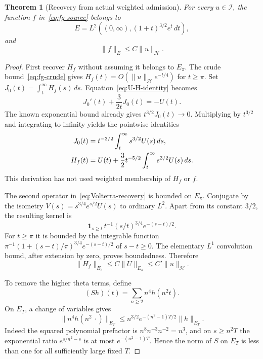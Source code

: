 \documentclass[11pt,a4paper]{article}
\numberwithin{equation}{section}
\newtheorem{theorem}{Theorem}[section]
\theoremstyle{definition}
\theoremstyle{remark}
\newcommand{\Hh}{\mathcal H}
\newcommand{\Ii}{\mathcal I}
\newcommand{\norm}[1]{\lVert #1\rVert}
\begin{document}
\begin{theorem}[Recovery from actual weighted admission]\label{thm:recovery}
For every $u\in\Ii$, the function $f$ in~\eqref{eq:fg-source} belongs to
\begin{equation}\label{eq:E-global}
 E=L^2((0,\infty),(1+t)^{3/2}e^t\,dt),
\end{equation}
and
\begin{equation}\label{eq:recovery-bound}
 \norm{f}_E\le C\norm{u}_{\Hh}.
\end{equation}
\end{theorem}
\begin{proof}
First recover $H_f$ without assuming it belongs to $E_\pi$. The crude bound~\eqref{eq:fg-crude} gives
$H_f(t)=O(\norm{u}_{\Hh}e^{-t/4})$ for $t\ge\pi$. Set
$J_0(t)=\int_t^\infty H_f(s)\,ds$. Equation~\eqref{eq:U-H-identity} becomes
\[
 J_0'(t)+\frac3{2t}J_0(t)=-U(t).
\]
The known exponential bound already gives $t^{3/2}J_0(t)\to0$. Multiplying by $t^{3/2}$ and integrating to infinity yields the pointwise identities
\begin{align}
 J_0(t)&=t^{-3/2}\int_t^\infty s^{3/2}U(s)\,ds,\notag\\
 H_f(t)&=U(t)+\frac32t^{-5/2}\int_t^\infty s^{3/2}U(s)\,ds.
 \label{eq:Volterra-recovery}
\end{align}
This derivation has not used weighted membership of $H_f$ or $f$.

The second operator in~\eqref{eq:Volterra-recovery} is bounded on $E_\pi$. Conjugate by the isometry
$V(s)=s^{3/4}e^{s/2}U(s)$ to ordinary $L^2$. Apart from its constant $3/2$, the resulting kernel is
\[
 \boldsymbol1_{s\ge t}\,t^{-1}(s/t)^{3/4}e^{-(s-t)/2}.
\]
For $t\ge\pi$ it is bounded by the integrable function
$\pi^{-1}(1+(s-t)/\pi)^{3/4}e^{-(s-t)/2}$ of $s-t\ge0$.
The elementary $L^1$ convolution bound, after extension by zero, proves boundedness. Therefore
\begin{equation}\label{eq:Hf-weighted}
 \norm{H_f}_{E_\pi}\le C\norm{U}_{E_\pi}
 \le C'\norm{u}_{\Hh}.
\end{equation}

To remove the higher theta terms, define
\[
 (Sh)(t)=\sum_{n\ge2}n^4h(n^2t).
\]
On $E_T$, a change of variables gives
\begin{equation}\label{eq:dilation-E}
 \norm{n^4h(n^2\,\cdot)}_{E_T}
 \le n^{3/2}e^{-(n^2-1)T/2}\norm{h}_{E_T}.
\end{equation}
Indeed the squared polynomial prefactor is $n^8n^{-3}n^{-2}=n^3$, and on $s\ge n^2T$ the exponential ratio
$e^{s/n^2-s}$ is at most $e^{-(n^2-1)T}$. Hence the norm of $S$ on $E_T$ is less than one for all sufficiently large fixed $T$.


\end{proof}
\end{document}
